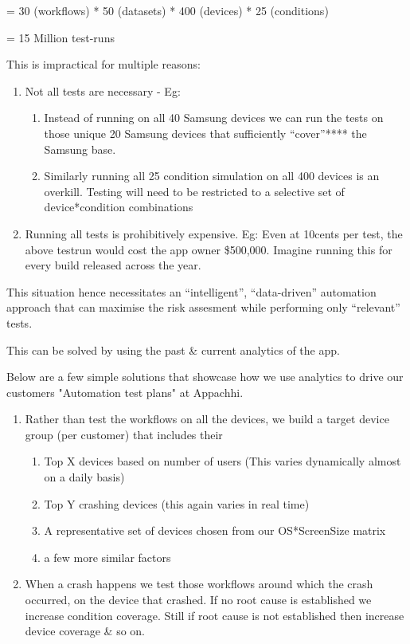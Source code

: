 = 30 (workflows) * 50 (datasets) * 400 (devices) * 25 (conditions)

= 15 Million test-runs

This is impractical for multiple reasons:
\begin{enumerate}
    \item Not all tests are necessary - Eg: 
    \begin{enumerate}
        \item Instead of running on all 40 Samsung devices we can run the tests on those unique 20 Samsung devices that sufficiently “cover”**** the Samsung base.
        \item Similarly running all 25 condition simulation on all 400 devices is an overkill. Testing will need to be restricted to a selective set of device*condition combinations
    \end{enumerate}
    \item Running all tests is prohibitively expensive. Eg: Even at 10cents per test, the above testrun would cost the app owner \$500,000. Imagine running this for every build released across the year.
\end{enumerate}

This situation hence necessitates an “intelligent”, “data-driven” automation approach that can maximise the risk assesment while performing only “relevant” tests.



This can be solved by using the past & current analytics of the app.



Below are a few simple solutions that showcase how we use analytics to drive our customers "Automation test plans" at Appachhi.

\begin{enumerate}
    \item Rather than test the workflows on all the devices, we build a target device group (per customer) that includes their
    \begin{enumerate}
        \item Top X devices based on number of users (This varies dynamically almost on a daily basis)
        \item Top Y crashing devices (this again varies in real time)
        \item A representative set of devices chosen from our OS*ScreenSize matrix
        \item a few more similar factors
    \end{enumerate}
    \item When a crash happens we test those workflows around which the crash occurred, on the device that crashed. If no root cause is established we increase condition coverage. Still if root cause is not established then increase device coverage & so on.
\end{enumerate}

